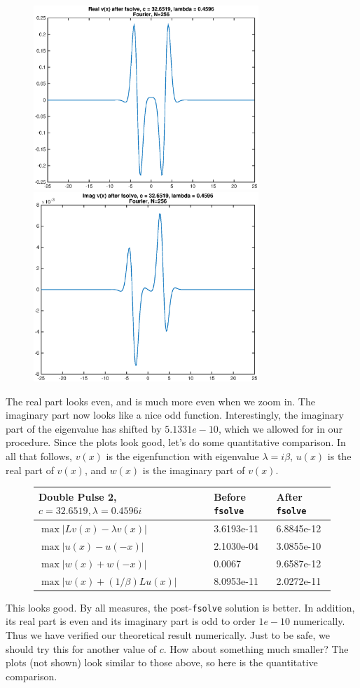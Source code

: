 \documentclass[12pt]{article}
\begin{document}
\begin{figure}[H]
\includegraphics[width=8.5cm]{1eigenfnrealafter.eps}
\includegraphics[width=8.5cm]{1eigenfnimagafter.eps}
\end{figure}
The real part looks even, and is much more even when we zoom in. The imaginary part now looks like a nice odd function. Interestingly, the imaginary part of the eigenvalue has shifted by $5.1331e-10$, which we allowed for in our procedure. Since the plots look good, let's do some quantitative comparison. In all that follows, $v(x)$ is the eigenfunction with eigenvalue $\lambda = i \beta$, $u(x)$ is the real part of $v(x)$, and $w(x)$ is the imaginary part of $v(x)$.

\begin{figure}[H]
\begin{tabular}{l|l|l}
 Double Pulse 2, $c = 32.6519, \lambda=0.4596i$  & Before \texttt{fsolve} & After \texttt{fsolve} \\ \hline
$\max|Lv(x) - \lambda v(x)|$  & 3.6193e-11 & 6.8845e-12 \\ 
$\max|u(x) - u(-x) |$         & 2.1030e-04 & 3.0855e-10 \\
$\max|w(x) + w(-x) |$         &  0.0067    & 9.6587e-12 \\
$\max|w(x) + (1/\beta)Lu(x)|$  &  8.0953e-11& 2.0272e-11 \\
\end{tabular}
\end{figure}
This looks good. By all measures, the post-\texttt{fsolve} solution is better. In addition, its real part is even and its imaginary part is odd to order $1e-10$ numerically. Thus we have verified our theoretical result numerically. Just to be safe, we should try this for another value of $c$. How about something much smaller? The plots (not shown) look similar to those above, so here is the quantitative comparison.
\end{document}
